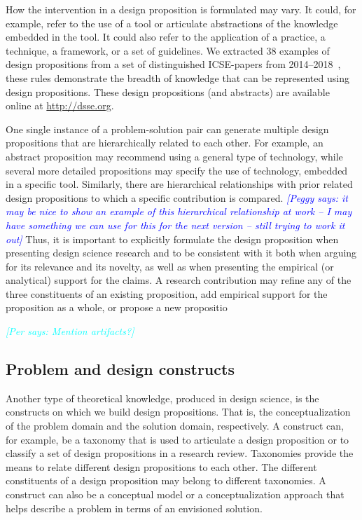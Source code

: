 \documentclass[graybox]{svmult}
\newcommand{\peggy}[1]{\textcolor{blue}{{\it [Peggy says: #1]}}}
\newcommand{\per}[1]{\textcolor{cyan}{{\it [Per says: #1]}}}
\newcommand{\peggy}[1]{}
\newcommand{\per}[1]{}
\begin{document}
How the intervention in a design proposition is formulated may vary. It could, for example, refer to the use of a tool or articulate abstractions of the knowledge embedded in the tool. It could also refer to the application of a practice, a technique, a framework, or a set of guidelines. We extracted 38 examples of design propositions from a set of distinguished ICSE-papers from 2014--2018~\cite{Engstrom19arxiv}, these rules demonstrate the breadth of knowledge that can be represented using design propositions. These design propositions (and abstracts) are available online at \url{http://dsse.org}.

One single instance of a problem-solution pair can generate multiple design propositions that are hierarchically related to each other. For example, an abstract proposition may recommend using a general type of technology, while several more detailed propositions may specify the use of technology, embedded in a specific tool.  Similarly, there are hierarchical relationships with prior related design propositions to which a specific contribution is compared.
\peggy{it may be nice to show an example of this hierarchical relationship at work -- I may have something we can use for this for the next version -- still trying to work it out}
Thus, it is important to explicitly formulate the design proposition when presenting design science research and to be consistent with it both when arguing for its relevance and its novelty, as well as when presenting the empirical (or analytical) support for the claims.  A research contribution may refine any of the three constituents of an existing proposition, add empirical support for the proposition as a whole, or propose a new propositio

\per{Mention artifacts?}



\subsection{Problem and design constructs}
\label{sec:constructs}
Another type of theoretical knowledge, produced in design science, is the 
constructs on which we build design propositions. That is, the conceptualization of the problem domain and the solution domain, respectively.  
A construct can, for example, be a taxonomy that is used to articulate a design proposition or to classify a set of design propositions in a research review. 
Taxonomies provide the means to relate different design propositions to each other. The different constituents of a design proposition may belong to different taxonomies. A construct can also be a conceptual model or a conceptualization approach that helps describe a problem in terms of an envisioned solution.
\end{document}
